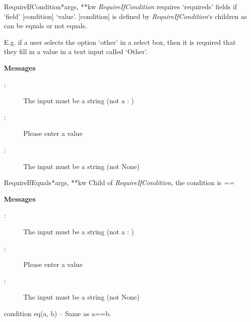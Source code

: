 \documentclass[letterpaper,10pt,english]{manual}
\begin{document}
\hypertarget{webscavator.forms.validators.RequireIfCondition}{}\begin{classdesc}{RequireIfCondition}{*args, **kw}
\emph{RequireIfCondition} requires `requireds' fields if `field' {[}condition{]} `value'. {[}condition{]} is 
defined by \emph{RequireIfCondition}`s children as can be equals or not equals.

E.g. if a user selects the option `other' in a select box, then it is required that they
fill in a value in a text input called `Other'.

\textbf{Messages}
\begin{description}
\item[:]
The input must be a string (not a : )

\item[:]
Please enter a value

\item[:]
The input must be a string (not None)

\end{description}
\end{classdesc}

\hypertarget{webscavator.forms.validators.RequireIfEquals}{}\begin{classdesc}{RequireIfEquals}{*args, **kw}
Child of \emph{RequireIfCondition}, the condition is \emph{==}

\textbf{Messages}
\begin{description}
\item[:]
The input must be a string (not a : )

\item[:]
Please enter a value

\item[:]
The input must be a string (not None)

\end{description}

\hypertarget{webscavator.forms.validators.RequireIfEquals.condition}{}\begin{methoddesc}{condition}{}
eq(a, b) -- Same as a==b.
\end{methoddesc}
\end{classdesc}
\end{document}
